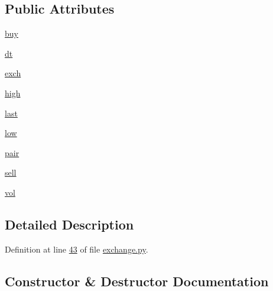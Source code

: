 \subsection*{Public Attributes}
\begin{DoxyCompactItemize}
\item 
\hyperlink{classexchange_1_1_ticker_a2ca48c3fa9aba92241392a05bef39324}{buy}
\item 
\hyperlink{classexchange_1_1_ticker_a45e3162d9956cee797f21d93c44c6baf}{dt}
\item 
\hyperlink{classexchange_1_1_ticker_a33f33fe9a12da3ce52938afdc577c061}{exch}
\item 
\hyperlink{classexchange_1_1_ticker_aace381ca15468df6a40e8d86b7710a7f}{high}
\item 
\hyperlink{classexchange_1_1_ticker_add7c2d95fa790dcdffddae2e584ce5f5}{last}
\item 
\hyperlink{classexchange_1_1_ticker_a1c1f26a47a82fc799fcebf158e104405}{low}
\item 
\hyperlink{classexchange_1_1_ticker_a382f9199d13a7b5929a26065fad4e491}{pair}
\item 
\hyperlink{classexchange_1_1_ticker_a5ba9e257d2ed28f02528a37d9ebd793e}{sell}
\item 
\hyperlink{classexchange_1_1_ticker_a24c0dd396aebc54c06e429a68c964ea3}{vol}
\end{DoxyCompactItemize}


\subsection{Detailed Description}


Definition at line \hyperlink{exchange_8py_source_l00043}{43} of file \hyperlink{exchange_8py_source}{exchange.\+py}.



\subsection{Constructor \& Destructor Documentation}
